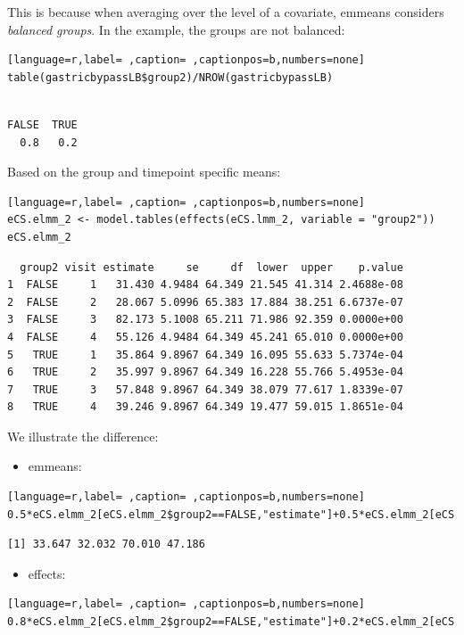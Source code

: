 \documentclass[12pt]{article}
\begin{document}
This is because when averaging over the level of a covariate, emmeans
considers \emph{balanced groups}. In the example, the groups are not
balanced:
\begin{lstlisting}[language=r,label= ,caption= ,captionpos=b,numbers=none]
table(gastricbypassLB$group2)/NROW(gastricbypassLB)
\end{lstlisting}

\begin{verbatim}

FALSE  TRUE 
  0.8   0.2
\end{verbatim}


Based on the group and timepoint specific means:
\begin{lstlisting}[language=r,label= ,caption= ,captionpos=b,numbers=none]
eCS.elmm_2 <- model.tables(effects(eCS.lmm_2, variable = "group2"))
eCS.elmm_2
\end{lstlisting}

\begin{verbatim}
  group2 visit estimate     se     df  lower  upper    p.value
1  FALSE     1   31.430 4.9484 64.349 21.545 41.314 2.4688e-08
2  FALSE     2   28.067 5.0996 65.383 17.884 38.251 6.6737e-07
3  FALSE     3   82.173 5.1008 65.211 71.986 92.359 0.0000e+00
4  FALSE     4   55.126 4.9484 64.349 45.241 65.010 0.0000e+00
5   TRUE     1   35.864 9.8967 64.349 16.095 55.633 5.7374e-04
6   TRUE     2   35.997 9.8967 64.349 16.228 55.766 5.4953e-04
7   TRUE     3   57.848 9.8967 64.349 38.079 77.617 1.8339e-07
8   TRUE     4   39.246 9.8967 64.349 19.477 59.015 1.8651e-04
\end{verbatim}


We illustrate the difference:
\begin{itemize}
\item emmeans:
\end{itemize}
\begin{lstlisting}[language=r,label= ,caption= ,captionpos=b,numbers=none]
0.5*eCS.elmm_2[eCS.elmm_2$group2==FALSE,"estimate"]+0.5*eCS.elmm_2[eCS.elmm_2$group2==TRUE,"estimate"]
\end{lstlisting}

\begin{verbatim}
[1] 33.647 32.032 70.010 47.186
\end{verbatim}


\begin{itemize}
\item effects:
\end{itemize}
\begin{lstlisting}[language=r,label= ,caption= ,captionpos=b,numbers=none]
0.8*eCS.elmm_2[eCS.elmm_2$group2==FALSE,"estimate"]+0.2*eCS.elmm_2[eCS.elmm_2$group2==TRUE,"estimate"]
\end{lstlisting}
\end{document}
